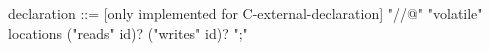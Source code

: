 \begin{syntax}
  declaration ::= {[only implemented for C-external-declaration] "//@" "volatile" locations ("reads" id)? ("writes" id)? ";"}
\end{syntax}

